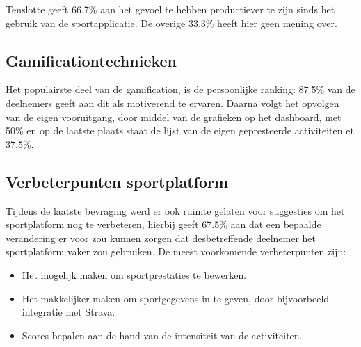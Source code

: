 Tenslotte geeft 66.7\% aan het gevoel te hebben productiever te zijn sinds het gebruik van de sportapplicatie. De overige 33.3\% heeft hier geen mening over.

\subsection{Gamificationtechnieken}

Het populairste deel van de gamification, is de persoonlijke ranking: 87.5\% van de deelnemers geeft aan dit als motiverend te ervaren. Daarna volgt het opvolgen van de eigen vooruitgang, door middel van de grafieken op het dashboard, met 50\% en op de laatste plaats staat de lijst van de eigen gepresteerde activiteiten et 37.5\%.

\subsection{Verbeterpunten sportplatform}
\label{ssec:verbeterpunten}

Tijdens de laatste bevraging werd er ook ruimte gelaten voor suggesties om het sportplatform nog te verbeteren, hierbij geeft 67.5\% aan dat een bepaalde verandering er voor zou kunnen zorgen dat desbetreffende deelnemer het sportplatform vaker zou gebruiken. De meest voorkomende verbeterpunten zijn:

\begin{itemize}
  \item Het mogelijk maken om sportprestaties te bewerken.
  \item Het makkelijker maken om sportgegevens in te geven, door bijvoorbeeld integratie met Strava.
  \item Scores bepalen aan de hand van de intensiteit van de activiteiten.
\end{itemize}